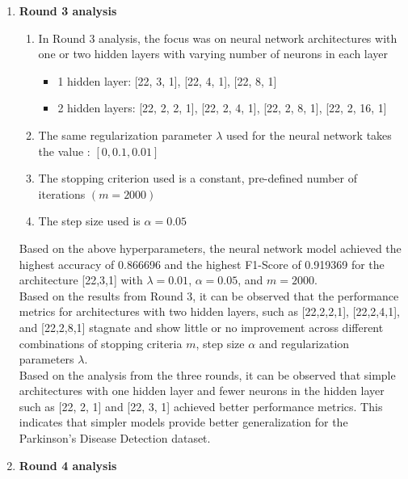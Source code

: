 \documentclass{article}
\begin{document}
\begin{enumerate}
\item \textbf{Round 3 analysis}
\begin{enumerate}
\item In Round 3 analysis, the focus was on neural network architectures with one or two hidden layers with varying number of neurons in each layer

\begin{itemize}
    \item 1 hidden layer: [22, 3, 1], [22, 4, 1], [22, 8, 1]
    \item 2 hidden layers: [22, 2, 2, 1], [22, 2, 4, 1], [22, 2, 8, 1], [22, 2, 16, 1]

\end{itemize}
\item The same regularization parameter $\lambda$ used for the neural network takes the value : $[0, 0.1, 0.01]$
\item The stopping criterion used is a constant, pre-defined number of iterations $(m = 2000)$
\item The step size used is $\alpha = 0.05$ \\


\end{enumerate}

Based on the above hyperparameters, the neural network model achieved the highest accuracy of 0.866696 and the highest F1-Score of 0.919369 for the architecture [22,3,1] with $\lambda = 0.01$, $\alpha = 0.05$, and $m = 2000$. \\

Based on the results from Round 3, it can be observed that the performance metrics for architectures with two hidden layers, such as [22,2,2,1], [22,2,4,1], and [22,2,8,1] stagnate and show little or no improvement across different combinations of stopping criteria $m$, step size $\alpha$ and regularization parameters $\lambda$. \\

Based on the analysis from the three rounds, it can be observed that simple architectures with one hidden layer and fewer neurons in the hidden layer such as [22, 2, 1] and [22, 3, 1] achieved better performance metrics. This indicates that simpler models provide better generalization for the Parkinson's Disease Detection dataset.\\

\item \textbf{Round 4 analysis}
\begin{enumerate}


\end{enumerate}
\end{enumerate}
\end{document}
